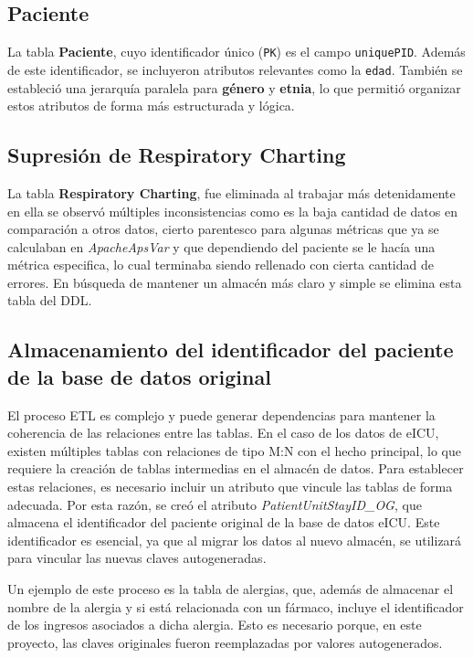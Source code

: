 \documentclass[12pt, a4paper, twoside]{article}
\begin{document}
	\subsection{Paciente}
	La tabla \textbf{Paciente}, cuyo identificador único (\texttt{PK}) es el campo \texttt{uniquePID}. Además de este identificador, se incluyeron atributos relevantes como la \texttt{edad}. También se estableció una jerarquía paralela para \textbf{género} y \textbf{etnia}, lo que permitió organizar estos atributos de forma más estructurada y lógica.
	
	\subsection{Supresión de Respiratory Charting}
	La tabla \textbf{Respiratory Charting}, fue eliminada al trabajar más detenidamente en ella se observó múltiples inconsistencias como es la baja cantidad de datos en comparación a otros datos, cierto parentesco para algunas métricas que ya se calculaban en \textit{ApacheApsVar} y que dependiendo del paciente se le hacía una métrica especifica, lo cual terminaba siendo rellenado con cierta cantidad de errores. En búsqueda de mantener un almacén más claro y simple se elimina esta tabla del DDL.
	
	\subsection{Almacenamiento del identificador del paciente de la base de datos original}
	
	El proceso ETL es complejo y puede generar dependencias para mantener la coherencia de las relaciones entre las tablas. En el caso de los datos de eICU, existen múltiples tablas con relaciones de tipo M:N con el hecho principal, lo que requiere la creación de tablas intermedias en el almacén de datos. Para establecer estas relaciones, es necesario incluir un atributo que vincule las tablas de forma adecuada. Por esta razón, se creó el atributo \textit{PatientUnitStayID\_OG}, que almacena el identificador del paciente original de la base de datos eICU. Este identificador es esencial, ya que al migrar los datos al nuevo almacén, se utilizará para vincular las nuevas claves autogeneradas. 
	
	Un ejemplo de este proceso es la tabla de alergias, que, además de almacenar el nombre de la alergia y si está relacionada con un fármaco, incluye el identificador de los ingresos asociados a dicha alergia. Esto es necesario porque, en este proyecto, las claves originales fueron reemplazadas por valores autogenerados.
	
\end{document}
